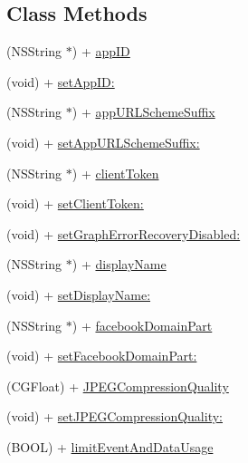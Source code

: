 \subsection*{Class Methods}
\begin{DoxyCompactItemize}
\item 
(N\-S\-String $\ast$) + \hyperlink{interface_f_b_s_d_k_settings_a0041724aca5e4f0e13f52aaa11beb2af}{app\-I\-D}
\item 
(void) + \hyperlink{interface_f_b_s_d_k_settings_a0a61ae6f92ae198ddaa113307566fd90}{set\-App\-I\-D\-:}
\item 
(N\-S\-String $\ast$) + \hyperlink{interface_f_b_s_d_k_settings_a0fcd8a2d4454a4a6cedc0dd488e06b94}{app\-U\-R\-L\-Scheme\-Suffix}
\item 
(void) + \hyperlink{interface_f_b_s_d_k_settings_ad82e92557a24e7de2275aec2db8432e5}{set\-App\-U\-R\-L\-Scheme\-Suffix\-:}
\item 
(N\-S\-String $\ast$) + \hyperlink{interface_f_b_s_d_k_settings_a281a16a620cbadd20dda5e4855640d47}{client\-Token}
\item 
(void) + \hyperlink{interface_f_b_s_d_k_settings_a70315485940c82fb7c98fb819f8df21e}{set\-Client\-Token\-:}
\item 
(void) + \hyperlink{interface_f_b_s_d_k_settings_a5bf7b01d1cdc577b603f2fd12e61c5a8}{set\-Graph\-Error\-Recovery\-Disabled\-:}
\item 
(N\-S\-String $\ast$) + \hyperlink{interface_f_b_s_d_k_settings_a6d772f95f3d504de70d1066be50c3991}{display\-Name}
\item 
(void) + \hyperlink{interface_f_b_s_d_k_settings_adb14b3ed74f013f0b3689f301cbe0405}{set\-Display\-Name\-:}
\item 
(N\-S\-String $\ast$) + \hyperlink{interface_f_b_s_d_k_settings_afe195ff5d7e03b3c2a50a260f28ab69b}{facebook\-Domain\-Part}
\item 
(void) + \hyperlink{interface_f_b_s_d_k_settings_a861fe9b96ab5fa88dc13be3f40193e19}{set\-Facebook\-Domain\-Part\-:}
\item 
(C\-G\-Float) + \hyperlink{interface_f_b_s_d_k_settings_a8bf3cebcfa7cc64d563efad000682800}{J\-P\-E\-G\-Compression\-Quality}
\item 
(void) + \hyperlink{interface_f_b_s_d_k_settings_a9ec12991ab33980d618a4470de56e15e}{set\-J\-P\-E\-G\-Compression\-Quality\-:}
\item 
(B\-O\-O\-L) + \hyperlink{interface_f_b_s_d_k_settings_a6e112856c4a8e12f9a7b1aa38550bb97}{limit\-Event\-And\-Data\-Usage}
\item 

\end{DoxyCompactItemize}
